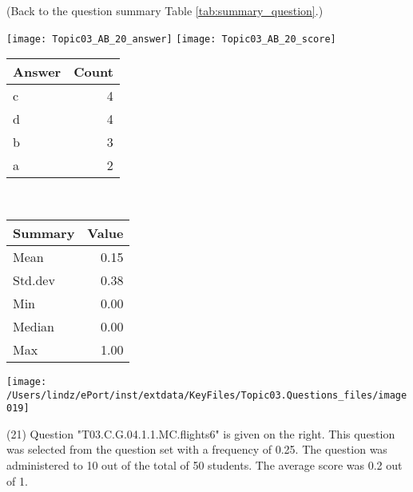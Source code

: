 \documentclass[12pt,english,nohyper]{tufte-handout}\usepackage[]{graphicx}\usepackage[]{color}
\begin{document}
 (Back to the question summary Table \ref{tab:summary_question}.)

\begin{center} \texttt{[image: Topic03\_AB\_20\_answer]} \texttt{[image: Topic03\_AB\_20\_score]} \end{center} 

\begin{center}%
\begin{tabular}{lr}
  \hline
Answer & Count \\ 
  \hline
c &   4 \\ 
  d &   4 \\ 
  b &   3 \\ 
  a &   2 \\ 
   \hline
\end{tabular}
~~~~~~~~%
\begin{tabular}{lr}
  \hline
Summary & Value \\ 
  \hline
Mean & 0.15 \\ 
  Std.dev & 0.38 \\ 
  Min & 0.00 \\ 
  Median & 0.00 \\ 
  Max & 1.00 \\ 
   \hline
\end{tabular}
\end{center}\newpage{}



\vspace{4cm}\begin{marginfigure}\texttt{[image: /Users/lindz/ePort/inst/extdata/KeyFiles/Topic03.Questions\_files/image019]}\end{marginfigure}\vspace{-4cm} (21) Question "T03.C.G.04.1.1.MC.flights6" is given on the right. This question was selected from the question set with a frequency of 0.25. The question was administered to 10 out of the total of 50 students. The average score was 0.2 out of 1.
\end{document}
